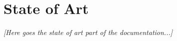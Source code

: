 %
%
%
%


\section{State of Art}
\label{sec:state-of-art}
\textit{[Here goes the state of art part of the documentation...]}

